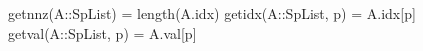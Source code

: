 \begin{juliacode}
getnnz(A::SpList) = length(A.idx)
getidx(A::SpList, p) = A.idx[p]
getval(A::SpList, p) = A.val[p]
\end{juliacode}